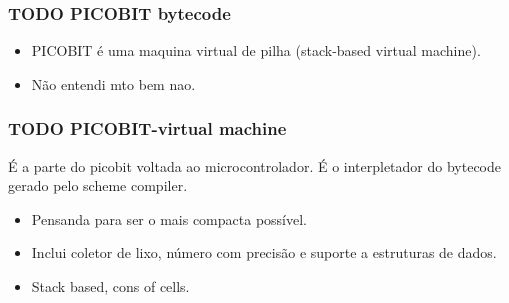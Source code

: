 \documentclass[11pt]{article}
\begin{document}
\subsubsection{{\bfseries\sffamily TODO} PICOBIT bytecode}
\label{sec-5-2-2}

\begin{itemize}
\item PICOBIT é uma maquina virtual de pilha (stack-based virtual machine).
\item Não entendi mto bem nao.
\end{itemize}

\subsubsection{{\bfseries\sffamily TODO} PICOBIT-virtual machine}
\label{sec-5-2-3}

É a parte do picobit voltada ao microcontrolador. É o interpletador do bytecode gerado pelo scheme compiler.

\begin{itemize}
\item Pensanda para ser o mais compacta possível.
\item Inclui coletor de lixo, número com precisão e suporte a estruturas de dados.
\item Stack based, cons of cells.
\end{itemize}
\end{document}
